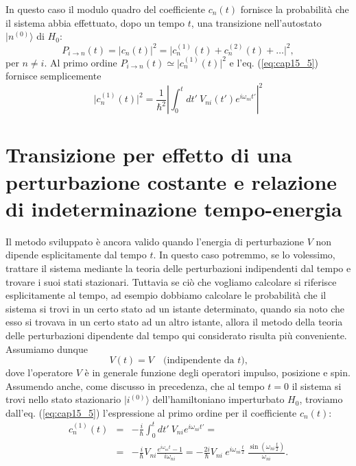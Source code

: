 \documentclass[a4paper,12pt,oneside]{book}
\begin{document}
In questo caso il modulo quadro del coefficiente $c_n (t)$ fornisce la probabilità che il sistema abbia effettuato, dopo un tempo $t$, una transizione nell'autostato $\vert n^{(0)} \rangle $ di $H_0$:
\begin{equation}
P_{i\rightarrow n} (t) = \vert c_n (t) \vert ^2 = \vert c_n ^{(1)}(t)+c_n ^{(2)}(t)+\dots \vert ^2 ,
\end{equation}
per $n \neq i$. Al primo ordine $P_{i\rightarrow n} (t) \simeq \vert c_n  ^{(1)}(t) \vert ^2$ e l'eq. (\ref{eq:cap15_5}) fornisce semplicemente
\begin{equation}
\vert c_n  ^{(1)}(t) \vert ^2 = \frac{1}{\hbar ^2}\left\vert \int _0 ^t dt'\ V_{ni} (t') e ^{i \omega _{ni} t'} \right\vert ^2
\end{equation}
\section{Transizione per effetto di una perturbazione costante e relazione di indeterminazione tempo-energia}
Il metodo sviluppato è ancora valido quando l'energia di perturbazione $V$ non dipende esplicitamente dal tempo $t$. In questo caso potremmo, se lo volessimo, trattare il sistema  mediante la teoria delle perturbazioni indipendenti dal tempo e trovare i suoi stati stazionari. Tuttavia se ciò che vogliamo calcolare si riferisce esplicitamente al tempo, ad esempio dobbiamo calcolare le probabilità che il sistema si trovi in un certo stato ad un istante determinato, quando sia noto che esso si trovava in un certo stato ad un altro istante, allora il metodo della teoria delle perturbazioni dipendente dal tempo qui considerato risulta più conveniente.\\
Assumiamo dunque
\begin{equation}
V(t) = V \quad \textrm{(indipendente da }t\textrm{),}
\end{equation}
dove l'operatore $V$ è in generale funzione degli operatori impulso, posizione e spin.\\
Assumendo anche, come discusso in precedenza, che al tempo $t=0$ il sistema si trovi nello stato stazionario $\vert i^{(0)}\rangle $ dell'hamiltoniano imperturbato $H_0$, troviamo dall'eq. (\ref{eq:cap15_5}) l'espressione al primo ordine per il coefficiente $c_n (t)$:
\begin{eqnarray}
c_n ^{(1)} (t) & = & -\frac{i}{\hbar} \int _0 ^t dt'\ V_{ni} e^{i \omega _{ni} t'} = \nonumber \\
&=& -\frac{i}{\hbar} V_{ni} \frac{e^{i \omega _{ni} t}-1}{i \omega _{ni}}= -\frac{2i}{\hbar} V_{ni}\ e^{i \omega _{ni} \frac{t}{2}}\ \frac{\sin{\left(\omega _{ni} \frac{t}{2}\right)}}{\omega _{ni}} .
\end{eqnarray}
\end{document}
